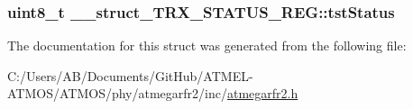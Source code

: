 \hypertarget{struct____struct___t_r_x___s_t_a_t_u_s___r_e_g_a6b86830580f6d63acfc01a521afe0c8e}{
\subsubsection[{tst\-Status}]{\setlength{\rightskip}{0pt plus 5cm}uint8\-\_\-t \-\_\-\-\_\-struct\-\_\-\-T\-R\-X\-\_\-\-S\-T\-A\-T\-U\-S\-\_\-\-R\-E\-G\-::tst\-Status}}\label{struct____struct___t_r_x___s_t_a_t_u_s___r_e_g_a6b86830580f6d63acfc01a521afe0c8e}


The documentation for this struct was generated from the following file\-:\begin{DoxyCompactItemize}
\item 
C\-:/\-Users/\-A\-B/\-Documents/\-Git\-Hub/\-A\-T\-M\-E\-L-\/\-A\-T\-M\-O\-S/\-A\-T\-M\-O\-S/phy/atmegarfr2/inc/\hyperlink{atmegarfr2_8h}{atmegarfr2.\-h}\end{DoxyCompactItemize}

